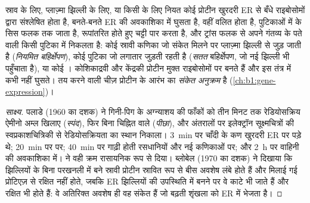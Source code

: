 \begin{proposition}[स्रावी पथ]\label{prop:b1:eukaryotic-cell:secretory}
स्राव के लिए, प्लाज़्मा झिल्ली के लिए, या किसी  के लिए नियत कोई
प्रोटीन खुरदरी ER से बँधे राइबोसोमों द्वारा संश्लेषित होता है, बनते-बनते
ER की अवकाशिका में घुसता है, वहीं वलित होता है, पुटिकाओं में  के
सिस फलक तक जाता है, रूपांतरित होते हुए चट्टी पार करता है, और ट्रांस फलक
से अपने गंतव्य के पते वाली किसी पुटिका में निकलता है: कोई स्रावी कणिका
जो संकेत मिलने पर प्लाज़्मा झिल्ली से जुड़ जाती है
(\emph{नियमित बहिर्क्षेपण}), कोई पुटिका जो लगातार
जुड़ती रहती है (\emph{सतत} बहिर्क्षेपण, जो नई झिल्ली भी पहुँचाता है), या
कोई । कोशिकाद्रवी और केंद्रकी प्रोटीन मुक्त राइबोसोमों पर बनते
हैं और इस तंत्र में कभी नहीं घुसते। तय करने वाली चीज़ प्रोटीन के आरंभ का
\emph{संकेत अनुक्रम} है
(\cref{ch:b1:gene-expression})।
\end{proposition}
\begin{proof}[साक्ष्य]
पलाडे (1960 का दशक) ने गिनी-पिग के अग्न्याशय की फाँकों को तीन मिनट तक
रेडियोसक्रिय ऐमीनो अम्ल खिलाए (\emph{स्पंद}), फिर बिना चिह्नित वाले
(\emph{पीछा}), और अंतरालों पर इलेक्ट्रॉन सूक्ष्मचित्रों की
स्वप्रकाशचित्रिकी से रेडियोसक्रियता का स्थान निकाला। \qty{3}{min} पर
चाँदी के कण खुरदरी ER पर पड़े थे; \qty{20}{min} पर  पर;
\qty{40}{min} पर गाढ़ी होती रसधानियों और नई कणिकाओं पर; और \qty{2}{h} पर
वाहिनी की अवकाशिका में।  ने वही क्रम रासायनिक रूप से दिया।
ब्लोबेल (1970 का दशक) ने दिखाया कि झिल्लियों के बिना परखनली में बने
स्रावी प्रोटीन स्रावित रूप से बीस अवशेष लंबे होते हैं और मिलाई गई
प्रोटिएज़ से रक्षित नहीं होते, जबकि ER झिल्लियों की उपस्थिति में बनने पर
वे काटे भी जाते हैं और रक्षित भी होते हैं: वे अतिरिक्त अवशेष ही वह संकेत
हैं जो बढ़ती शृंखला को ER में भेजता है।
\end{proof}

